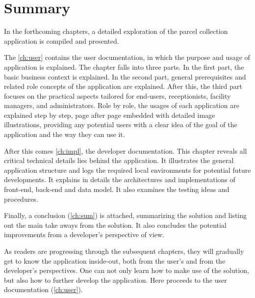 \section{Summary}
\label{sec:IntroSum}

In the forthcoming chapters, a detailed exploration of the parcel collection application is compiled and presented. 

The \autoref{ch:user} contains the user documentation, in which the purpose and usage of application is explained. The chapter falls into three parts. In the first part, the basic business context is explained. In the second part, general prerequisites and related role concepts of the application are explained. After this, the third part focuses on the practical aspects tailored for end-users, receptionists, facility managers, and administrators. Role by role, the usages of each application are explained step by step, page after page embedded with detailed image illustrations, providing any potential users with a clear idea of the goal of the application and the way they can use it. 

After this comes \autoref{ch:impl}, the developer documentation. This chapter reveals all critical technical details lies behind the application. It illustrates the general application structure and logs the required local environments for potential future developments. It explains in details the architectures and implementations of front-end, back-end and data model. It also examines the testing ideas and procedures. 

Finally, a conclusion (\autoref{ch:sum}) is attached, summarizing the solution and listing out the main take aways from the solution. It also concludes the potential improvements from a developer's perspective of view.

As readers are progressing through the subsequent chapters, they will gradually get to know the application inside-out, both from the user's and from the developer's perspectives. One can not only learn how to make use of the solution, but also how to further develop the application.
Here proceeds to the user documentation (\autoref{ch:user}).



